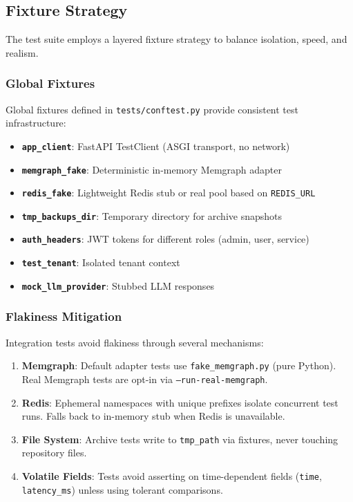 \subsection{Fixture Strategy}

The test suite employs a layered fixture strategy to balance isolation, speed, and realism.

\subsubsection{Global Fixtures}

Global fixtures defined in \texttt{tests/conftest.py} provide consistent test infrastructure:

\begin{itemize}
    \item \textbf{\texttt{app\_client}}: FastAPI TestClient (ASGI transport, no network)
    \item \textbf{\texttt{memgraph\_fake}}: Deterministic in-memory Memgraph adapter
    \item \textbf{\texttt{redis\_fake}}: Lightweight Redis stub or real pool based on \texttt{REDIS\_URL}
    \item \textbf{\texttt{tmp\_backups\_dir}}: Temporary directory for archive snapshots
    \item \textbf{\texttt{auth\_headers}}: JWT tokens for different roles (admin, user, service)
    \item \textbf{\texttt{test\_tenant}}: Isolated tenant context
    \item \textbf{\texttt{mock\_llm\_provider}}: Stubbed LLM responses
\end{itemize}

\subsubsection{Flakiness Mitigation}

Integration tests avoid flakiness through several mechanisms:

\begin{enumerate}
    \item \textbf{Memgraph}: Default adapter tests use \texttt{fake\_memgraph.py} (pure Python). Real Memgraph tests are opt-in via \texttt{--run-real-memgraph}.
    
    \item \textbf{Redis}: Ephemeral namespaces with unique prefixes isolate concurrent test runs. Falls back to in-memory stub when Redis is unavailable.
    
    \item \textbf{File System}: Archive tests write to \texttt{tmp\_path} via fixtures, never touching repository files.
    
    \item \textbf{Volatile Fields}: Tests avoid asserting on time-dependent fields (\texttt{time}, \texttt{latency\_ms}) unless using tolerant comparisons.
\end{enumerate}


